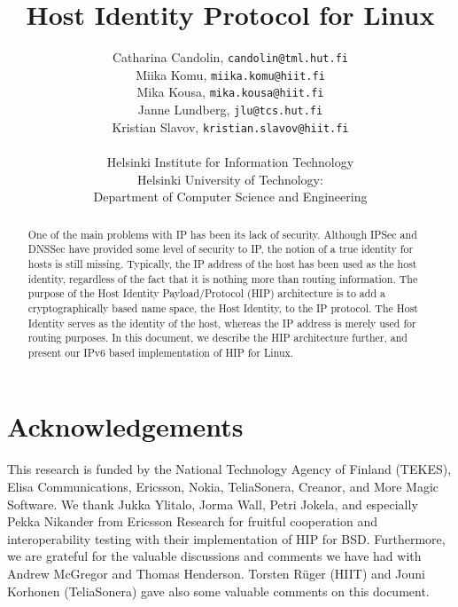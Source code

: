 \documentclass[a4paper,titlepage]{article}
\begin{document}


\title{Host Identity Protocol for Linux}
\author{Catharina Candolin, \texttt{candolin@tml.hut.fi} \\
        Miika Komu, \texttt{miika.komu@hiit.fi} \\
	Mika Kousa, \texttt{mika.kousa@hiit.fi} \\
	Janne Lundberg, \texttt{jlu@tcs.hut.fi} \\
	Kristian Slavov, \texttt{kristian.slavov@hiit.fi} \\
	\\
        Helsinki Institute for Information Technology \\       
        Helsinki University of Technology: \\
        Department of Computer Science and Engineering}
\maketitle


\fancyhf{} %
\fancyfoot[C]{ \thepage }
\pagestyle{fancy}

\tableofcontents

\newpage

\section*{Acknowledgements}

This research is funded by the National Technology Agency of Finland
(TEKES), Elisa Communications, Ericsson, Nokia, TeliaSonera,
Creanor, and More Magic Software. We thank Jukka Ylitalo, Jorma Wall,
Petri Jokela, and especially Pekka Nikander from Ericsson Research for
fruitful cooperation and interoperability testing with their
implementation of HIP for BSD. Furthermore, we are grateful for the
valuable discussions and comments we have had with Andrew McGregor and
Thomas Henderson. Torsten R{\"u}ger (HIIT) and Jouni Korhonen
(TeliaSonera) gave also some valuable comments on this document.

\newpage


\begin{abstract}
One of the main problems with IP has been its lack of
security. Although IPSec and DNSSec have provided some level of
security to IP, the notion of a true identity for hosts is still
missing. Typically, the IP address of the host has been used as the
host identity, regardless of the fact that it is nothing more than
routing information. The purpose of the Host Identity Payload/Protocol
(HIP) architecture is to add a cryptographically based name space, the
Host Identity, to the IP protocol. The Host Identity serves as the
identity of the host, whereas the IP address is merely used for
routing purposes.  In this document, we describe the HIP architecture
further, and present our IPv6 based implementation of HIP for Linux.
\end{abstract}







\appendix
\newpage
\pagebreak


\end{document}

